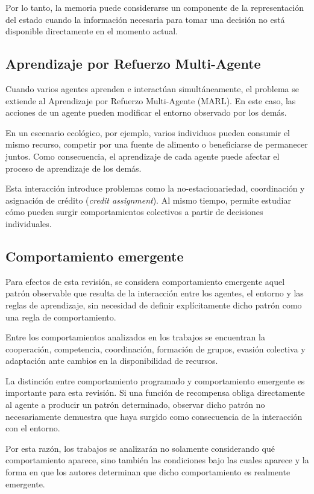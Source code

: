 \documentclass[conference]{IEEEtran}
\begin{document}
Por lo tanto, la memoria puede considerarse un componente de la
representación del estado cuando la información necesaria para tomar una
decisión no está disponible directamente en el momento actual.

\subsection{Aprendizaje por Refuerzo Multi-Agente}

Cuando varios agentes aprenden e interactúan simultáneamente, el problema
se extiende al Aprendizaje por Refuerzo Multi-Agente (MARL). En este caso,
las acciones de un agente pueden modificar el entorno observado por los
demás.

En un escenario ecológico, por ejemplo, varios individuos pueden consumir
el mismo recurso, competir por una fuente de alimento o beneficiarse de
permanecer juntos. Como consecuencia, el aprendizaje de cada agente puede
afectar el proceso de aprendizaje de los demás.

Esta interacción introduce problemas como la no-estacionariedad,
coordinación y asignación de crédito (\textit{credit assignment}). Al
mismo tiempo, permite estudiar cómo pueden surgir comportamientos
colectivos a partir de decisiones individuales.

\subsection{Comportamiento emergente}

Para efectos de esta revisión, se considera comportamiento emergente
aquel patrón observable que resulta de la interacción entre los agentes,
el entorno y las reglas de aprendizaje, sin necesidad de definir
explícitamente dicho patrón como una regla de comportamiento.

Entre los comportamientos analizados en los trabajos se encuentran la
cooperación, competencia, coordinación, formación de grupos, evasión
colectiva y adaptación ante cambios en la disponibilidad de recursos.

La distinción entre comportamiento programado y comportamiento emergente
es importante para esta revisión. Si una función de recompensa obliga
directamente al agente a producir un patrón determinado, observar dicho
patrón no necesariamente demuestra que haya surgido como consecuencia de
la interacción con el entorno.

Por esta razón, los trabajos se analizarán no solamente considerando qué
comportamiento aparece, sino también las condiciones bajo las cuales
aparece y la forma en que los autores determinan que dicho comportamiento
es realmente emergente.
\end{document}
